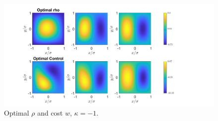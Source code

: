 \documentclass[11pt, a4paper]{article}
\theoremstyle{definition}
\begin{document}
	\begin{figure}[h]
		\centering
		\includegraphics[scale=0.35]{SCEx2kn1V.png}
		\caption{Optimal $\rho$ and cost $w$, $\kappa = - 1$.} 
		\label{F2b}
	\end{figure}
	
\end{document}
